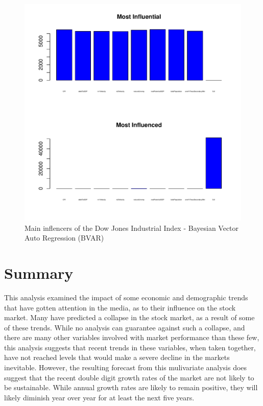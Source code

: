 \documentclass[12pt]{article}         %
\begin{document}
\begin{figure}[h!]
\begin{center}
\includegraphics[width=\linewidth]{plots/DJI_barchart_not_whitened.pdf}
\caption{Main inflencers of the Dow Jones Industrial Index - Bayesian Vector Auto Regression (BVAR)}
\label{fig:BVARInfluencers}
\end{center}
\end{figure}

\section{Summary}

This analysis examined the impact of some economic and demographic trends that have gotten attention in the media, as to their influence on the stock market.  Many have predicted a collapse in the stock market, as a result of some of these trends.  While no analysis can guarantee against such a collapse, and there are many other variables involved with market performance than these few, this analysis suggests that recent trends in these variables, when taken together, have not reached levels that would make a severe decline in the markets inevitable.  However, the resulting forecast from this mulivariate analysis does suggest that the recent double digit growth rates of the market are not likely to be sustainable.  While annual growth rates are likely to remain positive, they will likely diminish year over year for at least the next five years.
\end{document}

